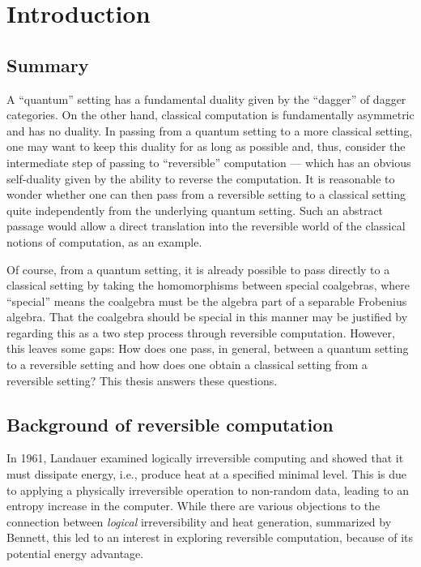 \chapter{Introduction}\label{chap:introduction}
\section{Summary}\label{sec:summary}
A ``quantum'' setting has a fundamental duality given by the ``dagger'' of dagger
categories\cite{selinger05:dagger,abramsky05:abstractscalars}. On the other hand, classical
computation is fundamentally asymmetric and has no duality. In passing from a quantum setting to a more classical setting, one
may want to keep this duality for as long as possible and, thus, consider the intermediate step of
passing to ``reversible'' computation --- which has an obvious self-duality given by the ability to
reverse the computation. It is reasonable to
wonder whether one can then pass from a reversible setting to a classical setting quite
independently from the underlying quantum setting. Such an abstract
passage would allow a direct translation into the reversible world of the classical notions of
computation, as an example.

Of course, from a quantum setting, it is already possible to pass directly to a classical setting by
taking the homomorphisms between special coalgebras, where ``special'' means the coalgebra must be
the algebra part of a separable Frobenius algebra. That the coalgebra should be special in this manner
may be justified by regarding this as a two step process through reversible computation. However,
this leaves some gaps: How does one pass, in general, between a quantum setting to a reversible
setting and how does one obtain a classical setting from a reversible setting? This thesis answers
these questions.
\section{Background of reversible computation}
\label{sec:background}

In 1961, Landauer\cite{landauer1961irreversibility} examined logically irreversible computing
and showed that it must dissipate energy, i.e., produce heat at a specified minimal level. This is
due to applying a physically irreversible operation to non-random data, leading to an entropy
increase in the computer. While there are various objections to the connection between
\emph{logical} irreversibility and heat generation, summarized by Bennett\cite{bennett2003notes},
this led to an interest in exploring reversible computation, because of its potential energy advantage.

